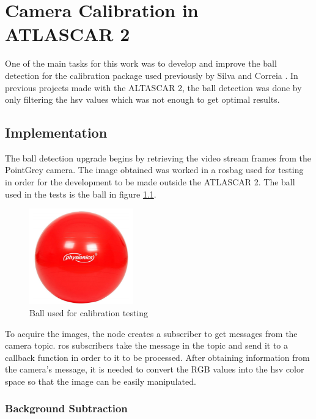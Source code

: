 \chapter{Camera Calibration in ATLASCAR 2}

One of the main tasks for this work was to develop and improve the ball detection for the calibration package used previously by Silva \cite{VieiradaSilva2016} and Correia \cite{Correia2017}. In previous projects made with the ALTASCAR 2, the ball detection was done by only filtering the \gls{hsv} values which was not enough to get optimal results.

\section{Implementation}

The ball detection upgrade begins by retrieving the video stream frames from the PointGrey camera. The image obtained was worked in a rosbag used for testing in order for the development to be made outside the ATLASCAR 2. The ball used in the tests is the ball in figure \ref{fig:ball}. 

\begin{figure}[htp]
	
	\centering
	\includegraphics[width=0.4\textwidth]{capcalib/imgs/ball.png}
	
	\caption{Ball used for calibration testing}
	\label{fig:ball}
	
\end{figure}

To acquire the images, the node creates a subscriber to get messages from the camera topic. \gls{ros} subscribers take the message in the topic and send it to a callback function in order to it to be processed. After obtaining information from the camera's message, it is needed to convert the RGB values into the \gls{hsv} color space so that the image can be easily manipulated.

\subsection{Background Subtraction}

